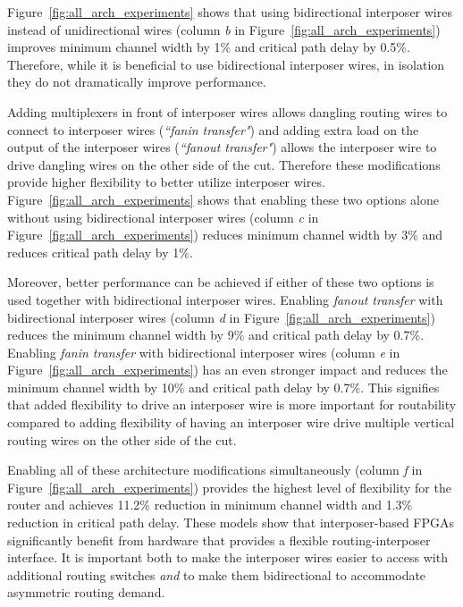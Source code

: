 \documentclass[journal]{IEEEtran}
\begin{document}
Figure~\ref{fig:all_arch_experiments} shows that using bidirectional interposer wires instead of unidirectional wires (column \textit{b} in Figure~\ref{fig:all_arch_experiments}) improves minimum channel width by 1\% and critical path delay by 0.5\%. Therefore, while it is beneficial to use bidirectional interposer wires, in isolation they do not dramatically improve performance.

Adding multiplexers in front of interposer wires allows dangling routing wires to connect to interposer wires (\textit{``fanin transfer"}) and adding extra load on the output of the interposer wires (\textit{``fanout transfer"}) allows the interposer wire to drive dangling wires on the other side of the cut. Therefore these modifications provide higher flexibility to better utilize interposer wires. Figure~\ref{fig:all_arch_experiments} shows that enabling these two options alone without using bidirectional interposer wires (column \textit{c} in Figure~\ref{fig:all_arch_experiments}) reduces minimum channel width by 3\% and reduces critical path delay by 1\%. 

Moreover, better performance can be achieved if either of these two options is used together with bidirectional interposer wires. Enabling \textit{fanout transfer} with bidirectional interposer wires (column \textit{d} in Figure~\ref{fig:all_arch_experiments}) reduces the minimum channel width by 9\% and critical path delay by 0.7\%. Enabling \textit{fanin transfer} with bidirectional interposer wires (column \textit{e} in Figure~\ref{fig:all_arch_experiments}) has an even stronger impact and reduces the minimum channel width by 10\% and critical path delay by 0.7\%. This signifies that added flexibility to drive an interposer wire is more important for routability compared to adding flexibility of having an interposer wire drive multiple vertical routing wires on the other side of the cut.

Enabling all of these architecture modifications simultaneously (column \textit{f} in Figure~\ref{fig:all_arch_experiments}) provides the highest level of flexibility for the router and achieves 11.2\% reduction in minimum channel width and 1.3\% reduction in critical path delay. These models show that interposer-based FPGAs significantly benefit from hardware that provides a flexible routing-interposer interface. It is important both to make the interposer wires easier to access with additional routing switches \textit{and} to make them bidirectional to accommodate asymmetric routing demand.
\end{document}
